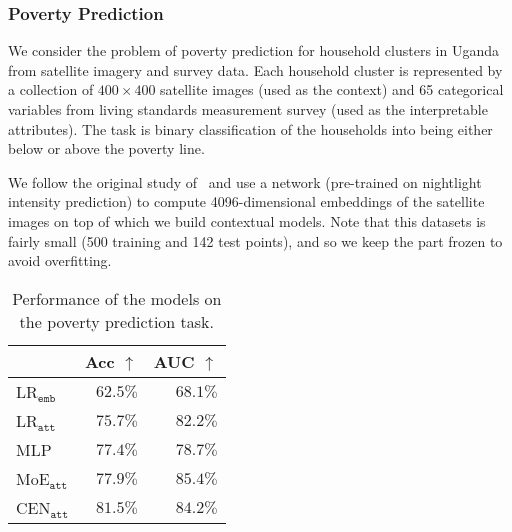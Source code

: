 \documentclass[twoside,11pt]{article}
\begin{document}
\subsubsection{Poverty Prediction}
\label{sec:applications-classification-poverty-prediction}

We consider the problem of poverty prediction for household clusters in Uganda from satellite imagery and survey data.
Each household cluster is represented by a collection of $400 \times 400$ satellite images (used as the context) and 65 categorical variables from living standards measurement survey (used as the interpretable attributes).
The task is binary classification of the households into being either below or above the poverty line.

We follow the original study of~\citet{jean2016combining} and use a {\VGGF} network (pre-trained on nightlight intensity prediction) to compute 4096-dimensional embeddings of the satellite images on top of which we build contextual models.
Note that this datasets is fairly small (500 training and 142 test points), and so we keep the {\VGGF} part frozen to avoid overfitting.


\begin{wraptable}{r}{0.35\textwidth}
    \centering
    \caption{Performance of the models on the poverty prediction task.}
    \label{tab:satellite-accuracy}
    \fontsize{10}{12}\selectfont
    \renewcommand{\arraystretch}{1.1}
    \begin{tabular}{@{}lrr@{}}
        \toprule
        & \textbf{Acc $\uparrow$} & \textbf{AUC $\uparrow$} \\
        \midrule
        LR$_\texttt{emb}$                               & $62.5\%$ & $68.1\%$ \\
        LR$_\texttt{att}$                               & $75.7\%$ & $82.2\%$ \\
        MLP                                             & $77.4\%$ & $78.7\%$ \\
        \midrule
        MoE$_\texttt{att}$                              & $77.9\%$ & $\mathbf{85.4}\%$ \\
        CEN$_\texttt{att}$                              & $\mathbf{81.5\%}$ & $84.2\%$ \\
        \bottomrule
    \end{tabular}
\end{wraptable}
 \vspace{5ex}
\end{document}
